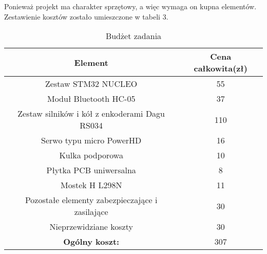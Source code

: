Ponieważ projekt ma charakter sprzętowy, a więc wymaga on kupna elementów. Zestawienie kosztów zostało umieszczone w tabeli 3.


\begin{table}[!htbp]
\begin{center}
\begin{tabular}{|c|c|}
\hline
\textbf{Element} & \textbf{Cena całkowita(zł)} \\ \hline\hline
Zestaw STM32 NUCLEO & 55 \\ \hline
Moduł Bluetooth HC-05 & 37 \\ \hline
Zestaw silników i kół z enkoderami Dagu RS034 & 110 \\ \hline
Serwo typu micro PowerHD & 16 \\ \hline
Kulka podporowa & 10 \\ \hline
Płytka PCB uniwersalna & 8 \\ \hline
Mostek H L298N & 11 \\ \hline
Pozostałe elementy zabezpieczające i zasilające & 30 \\ \hline
Nieprzewidziane koszty & 30 \\ \hline\hline
\textbf{Ogólny koszt:} & 307 \\ \hline

\end{tabular}
\caption{Budżet zadania}
\end{center}
\end{table}

